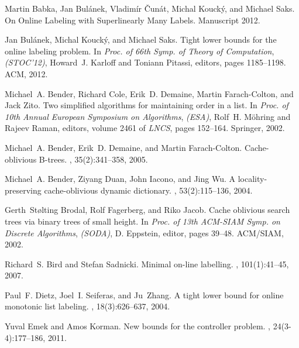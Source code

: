 \documentclass[11pt]{article}
\begin{document}
\newcommand{\etalchar}[1]{$^{#1}$}
\begin{thebibliography}{32}

{Martin Babka, Jan Bul\'{a}nek, Vladim\'{i}r \v{C}un\'{a}t, Michal Kouck\'{y}, and Michael Saks}.
\newblock On Online Labeling with Superlinearly Many Labels.
\newblock Manuscript 2012.

Jan Bul{\'a}nek, Michal Kouck{\'y}, and Michael Saks.
\newblock Tight lower bounds for the online labeling problem.
\newblock In  \emph{Proc. of 66th Symp. of Theory of Computation}, {\em (STOC'12)}, Howard~J. Karloff and Toniann Pitassi, editors, pages 1185--1198. ACM, 2012.

Michael~A. Bender, Richard Cole, Erik~D. Demaine, Martin Farach-Colton, and Jack Zito.
\newblock Two simplified algorithms for maintaining order in a list.
\newblock In \emph{Proc. of 10th Annual European Symposium on Algorithms}, {\em (ESA)}, Rolf~H. M{\"o}hring and Rajeev Raman, editors, volume 2461 of {\em LNCS}, pages 152--164. Springer, 2002.

Michael~A. Bender, Erik~D. Demaine, and Martin Farach-Colton.
\newblock Cache-oblivious {B}-trees.
, 35(2):341--358, 2005.

Michael~A. Bender, Ziyang Duan, John Iacono, and Jing Wu.
\newblock A locality-preserving cache-oblivious dynamic dictionary.
, 53(2):115--136, 2004.

Gerth~St{\o}lting Brodal, Rolf Fagerberg, and Riko Jacob.
\newblock Cache oblivious search trees via binary trees of small height.
\newblock In \emph{Proc. of 13th ACM-SIAM Symp. on Discrete Algorithms}, {\em (SODA)}, D. Eppstein, editor, pages 39--48. ACM/SIAM, 2002.

Richard~S. Bird and Stefan Sadnicki.
\newblock Minimal on-line labelling.
, 101(1):41--45, 2007.

Paul~F. Dietz, Joel~I. Seiferas, and Ju~Zhang.
\newblock A tight lower bound for online monotonic list labeling.
, 18(3):626--637, 2004.


Yuval Emek and Amos Korman.
\newblock New bounds for the controller problem.
, 24(3-4):177--186, 2011.


\end{thebibliography}
\end{document}
